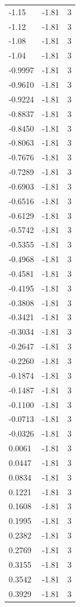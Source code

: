 \begin{longtable}{lrr}
  -1.15 & -1.81 & 3 \\
  -1.12 & -1.81 & 3 \\
  -1.08 & -1.81 & 3 \\
  -1.04 & -1.81 & 3 \\
  -0.9997 & -1.81 & 3 \\
  -0.9610 & -1.81 & 3 \\
  -0.9224 & -1.81 & 3 \\
  -0.8837 & -1.81 & 3 \\
  -0.8450 & -1.81 & 3 \\
  -0.8063 & -1.81 & 3 \\
  -0.7676 & -1.81 & 3 \\
  -0.7289 & -1.81 & 3 \\
  -0.6903 & -1.81 & 3 \\
  -0.6516 & -1.81 & 3 \\
  -0.6129 & -1.81 & 3 \\
  -0.5742 & -1.81 & 3 \\
  -0.5355 & -1.81 & 3 \\
  -0.4968 & -1.81 & 3 \\
  -0.4581 & -1.81 & 3 \\
  -0.4195 & -1.81 & 3 \\
  -0.3808 & -1.81 & 3 \\
  -0.3421 & -1.81 & 3 \\
  -0.3034 & -1.81 & 3 \\
  -0.2647 & -1.81 & 3 \\
  -0.2260 & -1.81 & 3 \\
  -0.1874 & -1.81 & 3 \\
  -0.1487 & -1.81 & 3 \\
  -0.1100 & -1.81 & 3 \\
  -0.0713 & -1.81 & 3 \\
  -0.0326 & -1.81 & 3 \\
  0.0061 & -1.81 & 3 \\
  0.0447 & -1.81 & 3 \\
  0.0834 & -1.81 & 3 \\
  0.1221 & -1.81 & 3 \\
  0.1608 & -1.81 & 3 \\
  0.1995 & -1.81 & 3 \\
  0.2382 & -1.81 & 3 \\
  0.2769 & -1.81 & 3 \\
  0.3155 & -1.81 & 3 \\
  0.3542 & -1.81 & 3 \\
  0.3929 & -1.81 & 3 \\

\end{longtable}
